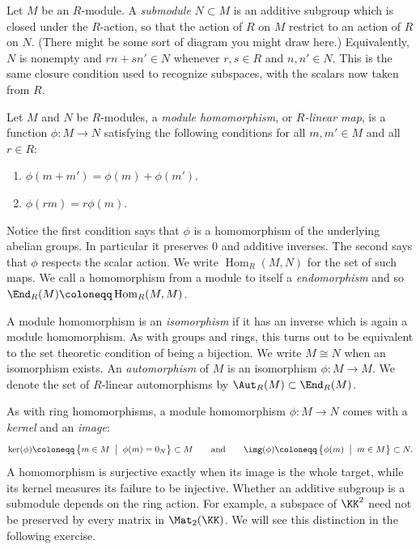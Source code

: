 \documentclass[12pt,reqno]{amsart}
\providecommand{\Hom}{\operatorname{Hom}}
\begin{document}
\hrulefill


Let $M$ be an $R$-module. A \emph{submodule} $N\subset M$ is an additive subgroup which is closed under the $R$-action, so that the action of $R$ on $M$ restrict to an action of $R$ on $N$. (There might be some sort of diagram you might draw here.) Equivalently, $N$ is nonempty and $rn+sn'\in N$ whenever $r,s\in R$ and $n,n'\in N$. This is the same closure condition used to recognize subspaces, with the scalars now taken from $R$.

Let $M$ and $N$ be $R$-modules, a \emph{module homomorphism}, or \emph{$R$-linear map}, is a function $\phi:M\to N$ satisfying the following conditions for all $m,m'\in M$ and all $r\in R$:
\begin{enumerate}[label=(\roman*)]
\item $\phi(m+m')=\phi(m)+\phi(m')$.
\item $\phi(rm)=r\phi(m)$.
\end{enumerate}
Notice the first condition says that $\phi$ is a homomorphism of the underlying abelian groups. In particular it preserves $0$ and additive inverses. The second says that $\phi$ respects the scalar action. We write $\Hom_R(M,N)$ for the set of such maps. We call a homomorphism from a module to itself a  \emph{endomorphism} and so $\End_{R}(M) \coloneqq \Hom_{R}(M,M)$.  

A module homomorphism is an \emph{isomorphism} if it has an inverse which is again a module homomorphism. As with groups and rings, this turns out to be equivalent to the set theoretic condition of being a bijection. We write $M\cong N$ when an isomorphism exists. An \emph{automorphism} of $M$ is an isomorphism $\phi:M \to M$. We denote the set of $R$-linear automorphisms by $\Aut_{R}(M) \subset \End_{R}(M)$. 

As with ring homomorphisms, a module homomorphism $\phi:M\to N$ comes with a \emph{kernel} and an \emph{image}:
\[
\ker(\phi) \coloneqq \left\{ m \in M \;\; \big| \;\; \phi(m) = 0_N \right\}\subset M \qquad \text{and} \qquad \img(\phi) \coloneqq \left\{\phi(m) \;\; \big| \;\; m \in M\right\} \subset N.
\]
A homomorphism is surjective exactly when its image is the whole target, while its kernel measures its failure to be injective. Whether an additive subgroup is a submodule depends on the ring action. For example, a subspace of $\KK^2$ need not be preserved by every matrix in $\Mat_2(\KK)$. We will see this distinction in the following exercise.

\hrulefill
\end{document}
